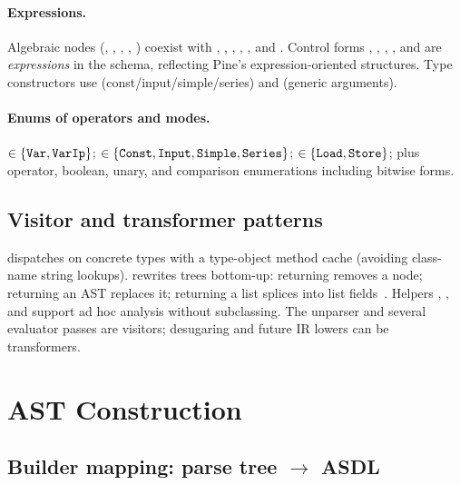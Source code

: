 \documentclass[11pt,a4paper]{article}
\begin{document}
\paragraph{Expressions.}
Algebraic nodes (, , , ,
) coexist with , ,
, , , and . Control forms
, , , , and  are
\emph{expressions} in the schema, reflecting Pine's expression-oriented
structures. Type constructors use  (const/input/simple/series)
and  (generic arguments).

\paragraph{Enums of operators and modes.}
 \(\in \{\texttt{Var},\texttt{VarIp}\}\);
 \(\in \{\texttt{Const},\texttt{Input},\texttt{Simple},\texttt{Series}\}\);
 \(\in \{\texttt{Load},\texttt{Store}\}\); plus operator,
boolean, unary, and comparison enumerations including bitwise forms.

\subsection{Visitor and transformer patterns}
\label{sec:visitor}

 dispatches on concrete types with a type-object method cache
(avoiding class-name string lookups).  rewrites trees
bottom-up: returning  removes a node; returning an AST replaces it;
returning a list splices into list fields~\citep{gamma1994design,asdl-python}.
Helpers , , and  support
ad hoc analysis without subclassing. The unparser and several evaluator passes
are visitors; desugaring and future IR lowers can be transformers.

\section{AST Construction}
\label{sec:builder}

\subsection{Builder mapping: parse tree \(\to\) ASDL}
\label{sec:builder-map}
\end{document}

